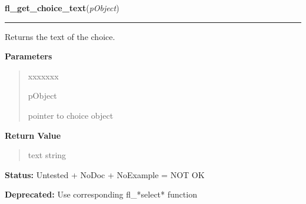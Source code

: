     \label{xformslib:deprecated:fl_get_choice_text}

    \vspace{0.5ex}

\hspace{.8\funcindent}\begin{boxedminipage}{\funcwidth}

    \raggedright \textbf{fl\_get\_choice\_text}(\textit{pObject})

    \vspace{-1.5ex}

    \rule{\textwidth}{0.5\fboxrule}
\setlength{\parskip}{2ex}
    Returns the text of the choice.

\setlength{\parskip}{1ex}
      \textbf{Parameters}
      \vspace{-1ex}

      \begin{quote}
        \begin{Ventry}{xxxxxxx}

          \item[pObject]

          pointer to choice object

        \end{Ventry}

      \end{quote}

      \textbf{Return Value}
    \vspace{-1ex}

      \begin{quote}
      text string

      \end{quote}

\textbf{Status:} Untested + NoDoc + NoExample = NOT OK



\textbf{Deprecated:} Use corresponding fl\_*select* function



    \end{boxedminipage}

    \label{xformslib:deprecated:fl_set_choice_fontsize}

    \vspace{0.5ex}

